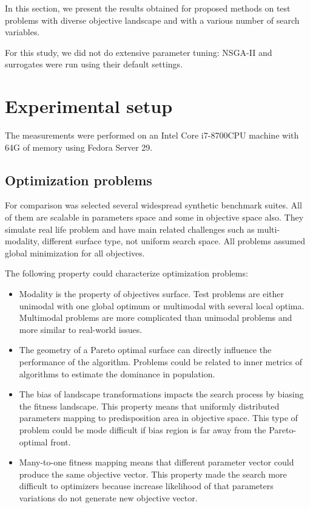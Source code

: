 In this section, we present the results obtained for proposed methods on test problems with diverse objective landscape and with a various number of search variables.


For this study, we did not do extensive parameter tuning: NSGA-II and surrogates were run using their default settings.
\cite{kouwe2018benchmarking}

\section{Experimental setup}
The measurements were performed on an Intel Core i7-8700CPU machine with 64G of memory using Fedora Server 29.

    \subsection{Optimization problems}
    For comparison was selected several widespread synthetic benchmark suites. All of them are scalable in parameters space and some in objective space also. They simulate real life problem and have main related challenges such as multi-modality, different surface type, not uniform search space. All problems assumed global minimization for all objectives.

    The following property \cite{WFGref} could characterize optimization problems:
    \begin{itemize}
        \item Modality is the property of objectives surface. Test problems are either unimodal with one global optimum or multimodal with several local optima. Multimodal problems are more complicated than unimodal problems and more similar to real-world issues.
        \item The geometry of a Pareto optimal surface can directly influence the performance of the algorithm. Problems could be related to inner metrics of algorithms to estimate the dominance in population.
        \item The bias of landscape transformations impacts the search process by biasing the fitness landscape. This property means that uniformly distributed parameters mapping to predisposition area in objective space. This type of problem could be mode difficult if bias region is far away from the Pareto-optimal front.
        \item Many-to-one fitness mapping means that different parameter vector could produce the same objective vector. This property made the search more difficult to optimizers because increase likelihood of that parameters variations do not generate new objective vector.
    \end{itemize}

